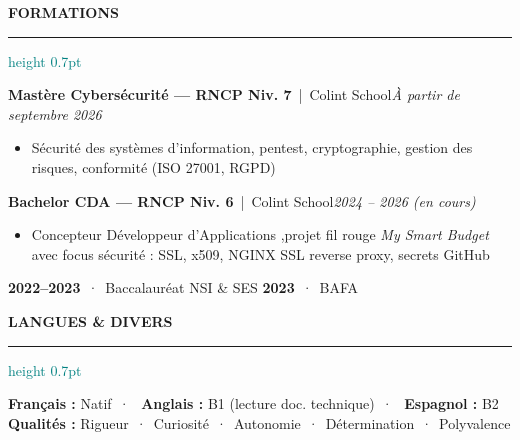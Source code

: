 \documentclass[a4paper,10pt]{article}
\newcommand{\cvsection}[1]{%
  \vspace{5pt}%
  {\color{navy}\textbf{\uppercase{#1}}}%
  \vspace{2pt}%
  \textcolor{teal}{\hrule height 0.7pt}%
  \vspace{3pt}%
}
\newcommand{\cventry}[4]{%
  \vspace{4pt}%
  {\color{navy}\textbf{#1}}~{\color{gray}|~#2}\hfill{\color{gray}\textit{\footnotesize #3}}\\[-1pt]
  #4%
}
\newcommand{\cvbullet}[1]{%
  \begin{itemize}[leftmargin=1em, itemsep=1pt, topsep=1pt, parsep=0pt]
    \item[\textcolor{teal}{\footnotesize--}] {\small\raggedright #1}
  \end{itemize}%
}
\begin{document}
\vspace{3pt}

\cvsection{Formations}

\cventry{Mastère Cybersécurité --- RNCP Niv. 7}{Colint School}{À partir de septembre 2026}{%
  \cvbullet{Sécurité des systèmes d'information, pentest, cryptographie, gestion des risques, conformité (ISO 27001, RGPD)}
}

\cventry{Bachelor CDA --- RNCP Niv. 6}{Colint School}{2024 -- 2026 (en cours)}{%
  \cvbullet{Concepteur Développeur d'Applications ,projet fil rouge \textit{My Smart Budget} avec focus sécurité : SSL, x509, NGINX SSL reverse proxy, secrets GitHub}
}

\vspace{5pt}
{\color{navy}\textbf{2022--2023}}~·~Baccalauréat NSI \& SES\hspace{1.5em}%
{\color{navy}\textbf{2023}}~·~BAFA

\cvsection{Langues \& Divers}

\vspace{3pt}
{\color{navy}\textbf{Français :}} Natif~·~%
{\color{navy}\textbf{Anglais :}} B1 (lecture doc. technique)~·~%
{\color{navy}\textbf{Espagnol :}} B2\\[2pt]
{\color{navy}\textbf{Qualités :}} Rigueur~·~Curiosité~·~Autonomie~·~Détermination~·~Polyvalence
\end{document}
